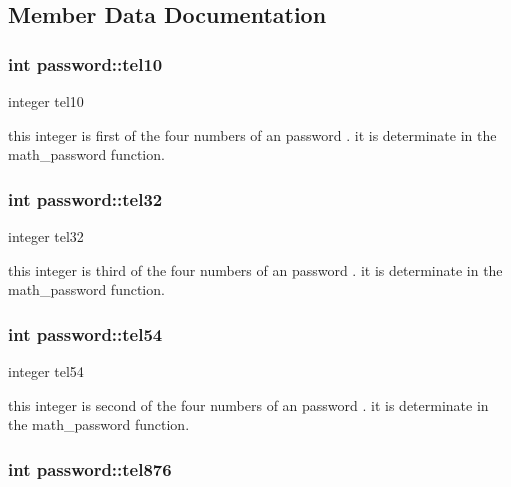 \subsection{Member Data Documentation}
\subsubsection[{\texorpdfstring{tel10}{tel10}}]{\setlength{\rightskip}{0pt plus 5cm}int password\+::tel10\hspace{0.3cm}{\ttfamily [protected]}}\hypertarget{classpassword_af09c363ed2ec22c8e900fdd6bf66c1f6}{}\label{classpassword_af09c363ed2ec22c8e900fdd6bf66c1f6}


integer tel10 

this integer is first of the four numbers of an password . it is determinate in the math\+\_\+password function. 
\subsubsection[{\texorpdfstring{tel32}{tel32}}]{\setlength{\rightskip}{0pt plus 5cm}int password\+::tel32\hspace{0.3cm}{\ttfamily [protected]}}\hypertarget{classpassword_a93ef3ccb4e71a683115c12435c89411d}{}\label{classpassword_a93ef3ccb4e71a683115c12435c89411d}


integer tel32 

this integer is third of the four numbers of an password . it is determinate in the math\+\_\+password function. 
\subsubsection[{\texorpdfstring{tel54}{tel54}}]{\setlength{\rightskip}{0pt plus 5cm}int password\+::tel54\hspace{0.3cm}{\ttfamily [protected]}}\hypertarget{classpassword_ad5afb40aeb150953f66a1c14745297bc}{}\label{classpassword_ad5afb40aeb150953f66a1c14745297bc}


integer tel54 

this integer is second of the four numbers of an password . it is determinate in the math\+\_\+password function. 
\subsubsection[{\texorpdfstring{tel876}{tel876}}]{\setlength{\rightskip}{0pt plus 5cm}int password\+::tel876\hspace{0.3cm}{\ttfamily [protected]}}\hypertarget{classpassword_a0e2e6d171003a3a8594a2cfec2b9c059}{}\label{classpassword_a0e2e6d171003a3a8594a2cfec2b9c059}


